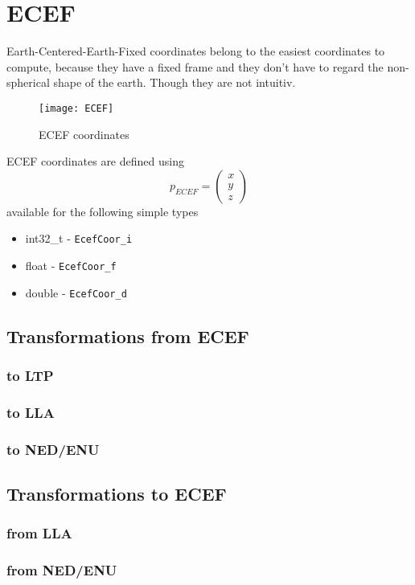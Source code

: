 \section{ECEF}
Earth-Centered-Earth-Fixed coordinates belong to the easiest coordinates to compute, because they have a fixed frame and they don't have to regard the non-spherical shape of the earth. Though they are not intuitiv. \\
\begin{figure}[h!]
	\centering
	\texttt{[image: ECEF]}
	\caption{ECEF coordinates}
	\label{ECEF coordinates}
\end{figure}

ECEF coordinates are defined using
\begin{equation}
p_{ECEF} = \begin{pmatrix} x \\ y \\ z \end{pmatrix}
\end{equation}
available for the following simple types
\begin{itemize}
\item int32\_t - \texttt{EcefCoor\_i}
\item float - \texttt{EcefCoor\_f}
\item double - \texttt{EcefCoor\_d}
\end{itemize}




\subsection{Transformations from ECEF}
\subsubsection*{to LTP}


\subsubsection*{to LLA}


\subsubsection*{to NED/ENU}



\subsection{Transformations to ECEF}
\subsubsection*{from LLA}


\subsubsection*{from NED/ENU}

